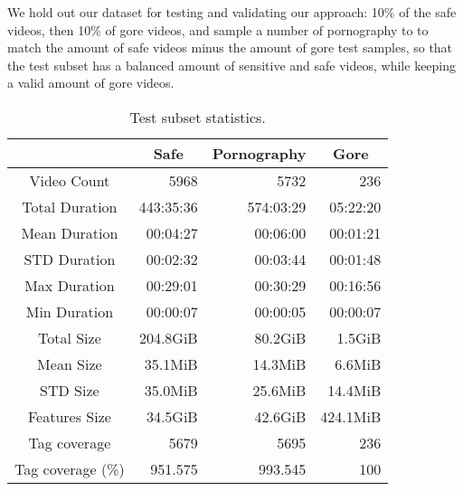 We hold out our dataset for testing and validating our approach: 10\% of the safe videos, then 10\% of gore videos, and sample a number of pornography to to match the amount of safe videos minus the amount of gore test samples, so that the test subset has a balanced amount of sensitive and safe videos, while keeping a valid amount of gore videos. 

\begin{table}
\centering
\label{tab:subset-stats}
\caption{Test subset statistics.}
\begin{tabular}{c|r|r|r} 
\multicolumn{1}{l|}{} & \multicolumn{1}{c|}{Safe} & \multicolumn{1}{c|}{Pornography} & \multicolumn{1}{c}{Gore}  \\ 
\hline
Video Count           & 5968                      & 5732                             & 236                        \\ 
\hline
Total Duration        & 443:35:36                 & 574:03:29                        & 05:22:20                   \\ 
\hline
Mean Duration         & 00:04:27                  & 00:06:00                         & 00:01:21                   \\ 
\hline
STD Duration          & 00:02:32                  & 00:03:44                         & 00:01:48                   \\ 
\hline
Max Duration          & 00:29:01                  & 00:30:29                         & 00:16:56                   \\ 
\hline
Min Duration          & 00:00:07                  & 00:00:05                         & 00:00:07                   \\ 
\hline
Total Size            & 204.8GiB                  & 80.2GiB                          & 1.5GiB                     \\ 
\hline
Mean Size             & 35.1MiB                   & 14.3MiB                          & 6.6MiB                     \\ 
\hline
STD Size              & 35.0MiB                   & 25.6MiB                          & 14.4MiB                    \\ 
\hline
Features Size         & 34.5GiB                   & 42.6GiB                          & 424.1MiB                   \\ 
\hline
Tag coverage          & 5679                      & 5695                             & 236                        \\ 
\hline
Tag coverage (\%)     & 951.575                   & 993.545                          & 100                        \\
\end{tabular}
\end{table}


